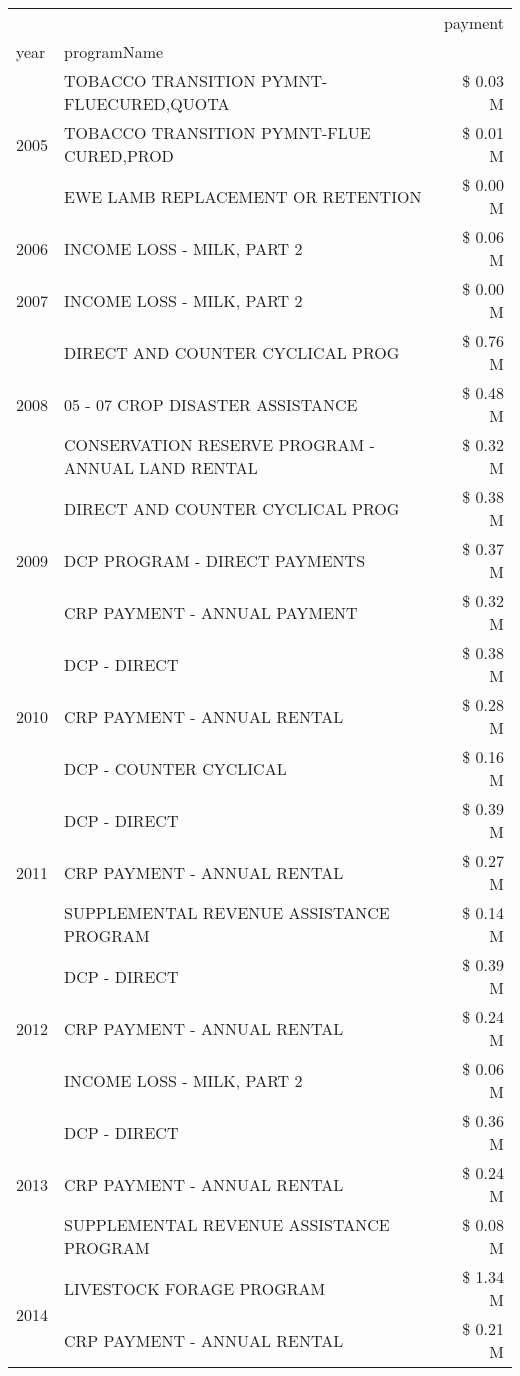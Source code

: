 \begin{tabular}{llr}
\toprule
 &  & payment \\
year & programName &  \\
\midrule
\multirow[t]{3}{*}{2005} & TOBACCO TRANSITION PYMNT-FLUECURED,QUOTA & \$ 0.03 M \\
 & TOBACCO TRANSITION PYMNT-FLUE CURED,PROD & \$ 0.01 M \\
 & EWE LAMB REPLACEMENT OR RETENTION & \$ 0.00 M \\
\cline{1-3}
2006 & INCOME LOSS - MILK, PART 2 & \$ 0.06 M \\
\cline{1-3}
2007 & INCOME LOSS - MILK, PART 2 & \$ 0.00 M \\
\cline{1-3}
\multirow[t]{3}{*}{2008} & DIRECT AND COUNTER CYCLICAL PROG & \$ 0.76 M \\
 & 05 - 07 CROP DISASTER ASSISTANCE & \$ 0.48 M \\
 & CONSERVATION RESERVE PROGRAM - ANNUAL LAND RENTAL & \$ 0.32 M \\
\cline{1-3}
\multirow[t]{3}{*}{2009} & DIRECT AND COUNTER CYCLICAL PROG & \$ 0.38 M \\
 & DCP PROGRAM - DIRECT PAYMENTS & \$ 0.37 M \\
 & CRP PAYMENT - ANNUAL PAYMENT & \$ 0.32 M \\
\cline{1-3}
\multirow[t]{3}{*}{2010} & DCP - DIRECT & \$ 0.38 M \\
 & CRP PAYMENT - ANNUAL RENTAL & \$ 0.28 M \\
 & DCP - COUNTER CYCLICAL & \$ 0.16 M \\
\cline{1-3}
\multirow[t]{3}{*}{2011} & DCP - DIRECT & \$ 0.39 M \\
 & CRP PAYMENT - ANNUAL RENTAL & \$ 0.27 M \\
 & SUPPLEMENTAL REVENUE ASSISTANCE PROGRAM & \$ 0.14 M \\
\cline{1-3}
\multirow[t]{3}{*}{2012} & DCP - DIRECT & \$ 0.39 M \\
 & CRP PAYMENT - ANNUAL RENTAL & \$ 0.24 M \\
 & INCOME LOSS - MILK, PART 2 & \$ 0.06 M \\
\cline{1-3}
\multirow[t]{3}{*}{2013} & DCP - DIRECT & \$ 0.36 M \\
 & CRP PAYMENT - ANNUAL RENTAL & \$ 0.24 M \\
 & SUPPLEMENTAL REVENUE ASSISTANCE PROGRAM & \$ 0.08 M \\
\cline{1-3}
\multirow[t]{3}{*}{2014} & LIVESTOCK FORAGE PROGRAM & \$ 1.34 M \\
 & CRP PAYMENT - ANNUAL RENTAL & \$ 0.21 M \\

\end{tabular}
